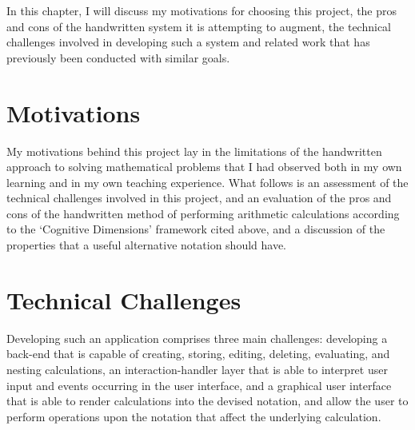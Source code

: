 \documentclass[12pt,twoside,notitlepage,xetex]{report}
\begin{document}
In this chapter, I will discuss my motivations for choosing this project, the pros and cons of the handwritten system it is attempting to augment, the technical challenges involved in developing such a system and related work that has previously been conducted with similar goals.

\section{Motivations}

My motivations behind this project lay in the limitations of the handwritten approach to solving mathematical problems that I had observed both in my own learning and in my own teaching experience.  What follows is an assessment of the technical challenges involved in this project, and an evaluation of the pros and cons of the handwritten method of performing arithmetic calculations according to the `Cognitive Dimensions' framework cited above, and a discussion of the properties that a useful alternative notation should have.

\pagebreak



\section{Technical Challenges}

Developing such an application comprises three main challenges: developing a back-end that is capable of creating, storing, editing, deleting, evaluating, and nesting calculations, an interaction-handler layer that is able to interpret user input and events occurring in the user interface, and a graphical user interface that is able to render calculations into the devised notation, and allow the user to perform operations upon the notation that affect the underlying calculation.
\end{document}
